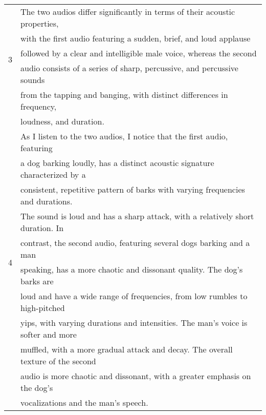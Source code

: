 \begin{table}
{\begin{tabular}{ll}
\midrule
\multirow{5}{*}{3} & The two audios differ significantly in terms of their acoustic properties, \\ & with the first audio featuring a sudden, brief, and loud applause \\ & followed by a clear and intelligible male voice, whereas the second \\ & audio consists of a series of sharp, percussive, and percussive sounds \\ & from the tapping and banging, with distinct differences in frequency, \\ & loudness, and duration. \\ 
\midrule
\multirow{10}{*}{4} & As I listen to the two audios, I notice that the first audio, featuring \\ & a dog barking loudly, has a distinct acoustic signature characterized by a \\ & consistent, repetitive pattern of barks with varying frequencies and durations. \\ & The sound is loud and has a sharp attack, with a relatively short duration. In \\ & contrast, the second audio, featuring several dogs barking and a man \\ & speaking, has a more chaotic and dissonant quality. The dog's barks are \\ & loud and have a wide range of frequencies, from low rumbles to high-pitched \\ & yips, with varying durations and intensities. The man’s voice is softer and more \\ & muffled, with a more gradual attack and decay. The overall texture of the second \\ & audio is more chaotic and dissonant, with a greater emphasis on the dog’s \\ & vocalizations and the man’s speech. \\
\midrule

\end{tabular}}
\end{table}
